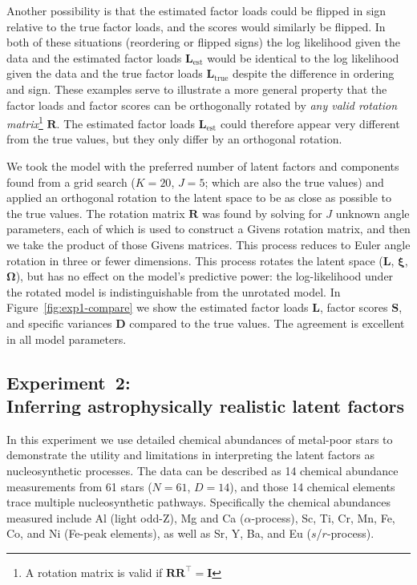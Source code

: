 \documentclass[twocolumn]{aastex62}
\newcommand{\vect}[1]{\boldsymbol{\mathbf{#1}}}
\renewcommand{\vec}[1]{\vect{#1}}
\newcommand{\transpose}{^\intercal}
\newcommand{\factorloads}{\textbf{L}}
\newcommand{\factorscores}{\textbf{S}}
\newcommand{\specificvariance}{\vec{D}}
\newcommand{\scoremeans}{\vec\xi}
\newcommand{\scorecovs}{\vec\Omega}
\newcommand{\NumData}{N}
\newcommand{\NumDimensions}{D}
\newcommand{\NumLatentFactors}{J}
\newcommand{\NumComponents}{K}
\begin{document}
Another possibility is that the estimated factor loads could be flipped in sign 
relative to the true factor loads, and the scores would similarly be flipped. 
In both of these situations (reordering or flipped signs) the log likelihood 
given the data and the estimated factor loads $\factorloads_\textrm{est}$ 
would be identical to the log likelihood given the data and the true factor loads 
$\factorloads_\textrm{true}$
despite the difference in ordering and sign. These examples serve to illustrate a more 
general property that the factor loads and factor scores can be orthogonally 
rotated by \emph{any valid rotation matrix}\footnote{A rotation matrix is valid if 
$\vec{R}\vec{R}\transpose = \vec{I}$} $\vec{R}$. The estimated factor loads 
$\factorloads_\textrm{est}$ could therefore appear very different from the true 
values, but they only differ by an orthogonal rotation. 




We took the model with the preferred number of latent factors and components found
from a grid search ($\NumComponents = 20$, $\NumLatentFactors = 5$; which are also
the true values) and applied an orthogonal rotation to the latent space to be as
close as possible to the true values. The rotation matrix $\mathbf{R}$ was found
by solving for $\NumLatentFactors$ unknown angle parameters, each of which is used
to construct a Givens rotation matrix, and then we take the product of those Givens
matrices. This process reduces to Euler angle rotation in three or fewer dimensions.
This process rotates the latent space
($\factorloads$, $\scoremeans$, $\scorecovs$), but has no effect on the model's 
predictive power: the log-likelihood \citep[or the Kullback-Leibler divergence;][]{Kullback:1951} under the
rotated model is indistinguishable from the unrotated model.
In Figure~\ref{fig:exp1-compare} we show the estimated factor loads $\factorloads$,
factor scores $\factorscores$, and specific variances $\specificvariance$ compared
to the true values. The agreement is excellent in all model parameters. 

 


\subsection{Experiment~2:\\Inferring astrophysically realistic latent factors}

In this experiment we use detailed chemical abundances of metal-poor stars 
\citep{Barklem:2005} to demonstrate the utility and limitations
in interpreting the latent factors as nucleosynthetic processes. The data 
can be described as 14 chemical abundance measurements from 61 stars ($\NumData = 61$, $\NumDimensions = 14$), and those 14 chemical elements trace multiple nucleosynthetic pathways. Specifically the chemical
abundances measured include Al (light odd-Z), Mg and Ca ($\alpha$-process), Sc, Ti, Cr, Mn, Fe, Co, and Ni (Fe-peak elements), as well as Sr, Y, Ba, and Eu ($s$/$r$-process). 
\end{document}
